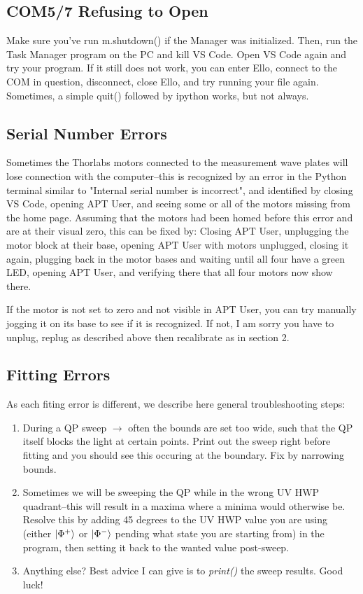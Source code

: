 \documentclass{paper}[11pt]
\begin{document}
\subsection{COM5/7 Refusing to Open}
Make sure you've run m.shutdown() if the Manager was initialized. Then, run the Task Manager program on the PC and kill VS Code. Open VS Code again and try your program. If it still does not work, you can enter Ello, connect to the COM in question, disconnect, close Ello, and try running your file again. Sometimes, a simple quit() followed by ipython works, but not always.
\subsection{Serial Number Errors}
Sometimes the Thorlabs motors connected to the measurement wave plates will lose connection with the computer--this is recognized by an error in the Python terminal similar to "Internal serial number is incorrect", and identified by closing VS Code, opening APT User, and seeing some or all of the motors missing from the home page. Assuming that the motors had been homed before this error and are at their visual zero, this can be fixed by: Closing APT User, unplugging the motor block at their base, opening APT User with motors unplugged, closing it again, plugging back in the motor bases and waiting until all four have a green LED, opening APT User, and verifying there that all four motors now show there. 

If the motor is not set to zero and not visible in APT User, you can try manually jogging it on its base to see if it is recognized. If not, I am sorry you have to unplug, replug as described above then recalibrate as in section 2.
\subsection{Fitting Errors}
As each fiting error is different, we describe here general troubleshooting steps:
\begin{enumerate}
    \item During a QP sweep $\rightarrow$ often the bounds are set too wide, such that the QP itself blocks the light at certain points. Print out the sweep right before fitting and you should see this occuring at the boundary. Fix by narrowing bounds.
    \item Sometimes we will be sweeping the QP while in the wrong UV HWP quadrant--this will result in a maxima where a minima would otherwise be. Resolve this by adding 45 degrees to the UV HWP value you are using (either $\ket{\Phi^+}$ or $\ket{\Phi^-}$ pending what state you are starting from) in the program, then setting it back to the wanted value post-sweep.
    \item Anything else? Best advice I can give is to \textit{print()} the sweep results. Good luck!
\end{enumerate}
\end{document}
